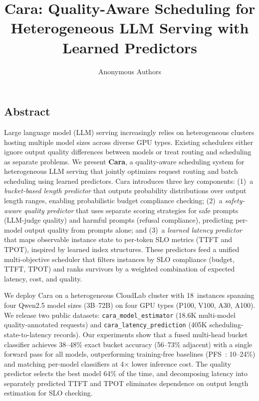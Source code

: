 \documentclass[letterpaper, anonymous, twocolumn, 10pt]{article}
\begin{document}
\date{}

\title{\Large \bf Cara: Quality-Aware Scheduling for Heterogeneous LLM Serving with Learned Predictors}

\author{
{\rm Anonymous Authors}
}

\maketitle



\subsection*{Abstract}

Large language model (LLM) serving increasingly relies on heterogeneous clusters hosting multiple model sizes across diverse GPU types.
Existing schedulers either ignore output quality differences between models or treat routing and scheduling as separate problems.
We present \textbf{Cara}, a quality-aware scheduling system for heterogeneous LLM serving that jointly optimizes request routing and batch scheduling using learned predictors.
Cara introduces three key components:
(1)~a \emph{bucket-based length predictor} that outputs probability distributions over output length ranges, enabling probabilistic budget compliance checking;
(2)~a \emph{safety-aware quality predictor} that uses separate scoring strategies for safe prompts (LLM-judge quality) and harmful prompts (refusal compliance), predicting per-model output quality from prompts alone;
and (3)~a \emph{learned latency predictor} that maps observable instance state to per-token SLO metrics (TTFT and TPOT), inspired by learned index structures.
These predictors feed a unified multi-objective scheduler that filters instances by SLO compliance (budget, TTFT, TPOT) and ranks survivors by a weighted combination of expected latency, cost, and quality.

We deploy Cara on a heterogeneous CloudLab cluster with 18~instances spanning four Qwen2.5 model sizes (3B--72B) on four GPU types (P100, V100, A30, A100).
We release two public datasets: \texttt{cara\_model\_estimator} (18.6K multi-model quality-annotated requests) and \texttt{cara\_latency\_prediction} (405K scheduling-state-to-latency records).
Our experiments show that a fused multi-head bucket classifier achieves 38--48\% exact bucket accuracy (56--73\% adjacent) with a single forward pass for all models, outperforming training-free baselines (PFS~\cite{Gong_2025}: 10--24\%) and matching per-model classifiers at 4$\times$ lower inference cost. The quality predictor selects the best model 64\% of the time, and decomposing latency into separately predicted TTFT and TPOT eliminates dependence on output length estimation for SLO checking.
\end{document}
